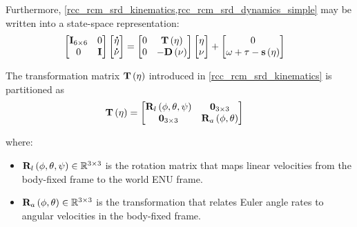 Furthermore, \cref{rcc_rcm_srd_kinematics,rcc_rcm_srd_dynamics_simple} may be written into a
state-space representation:
\begin{align}
	\begin{bmatrix}
		\lrdmatr{I}{6\times 6} & 0        \\
		0                      & \matr{I}
	\end{bmatrix}
	\begin{bmatrix}
		\vect{\dot{\eta}} \\
		\vect{\dot{\nu}}
	\end{bmatrix} & =
	\begin{bmatrix}
		0 & \matr{T}\left(\vect{\eta}\right)  \\
		0 & - \matr{D}\left(\vect{\nu}\right)
	\end{bmatrix}
	\begin{bmatrix}
		\vect{\eta} \\
		\vect{\nu}
	\end{bmatrix}
	+
	\begin{bmatrix}
		0 \\
		\vect{\omega} + \vect{\tau} - \vect{s}\left(\vect{\eta}\right)
	\end{bmatrix}
\end{align}

The transformation matrix $\matr{T}\left(\vect{\eta}\right)$ introduced in
\cref{rcc_rcm_srd_kinematics} is partitioned as
\begin{align}
	\matr{T}\left(\vect{\eta}\right) & =
	\begin{bmatrix}
		\lrdmatr{R}{l}\left(\phi,\theta,\psi\right) & \lrdmatr{0}{3\times 3}                 \\
		\lrdmatr{0}{3\times 3}                      & \lrdmatr{R}{a}\left(\phi,\theta\right)
	\end{bmatrix}
\end{align}

where:
\begin{itemize}
	\item $\lrdmatr{R}{l}\left(\scal{\phi},\scal{\theta},\scal{\psi}\right) \in \mathbb{R}^{3\times 3}$ is the rotation matrix that maps linear velocities from the body-fixed frame to the world ENU frame.
	\item $\lrdmatr{R}{a}\left(\scal{\phi},\scal{\theta}\right) \in \mathbb{R}^{3\times 3}$ is the transformation that relates Euler angle rates to angular velocities in the body-fixed frame.
\end{itemize}

